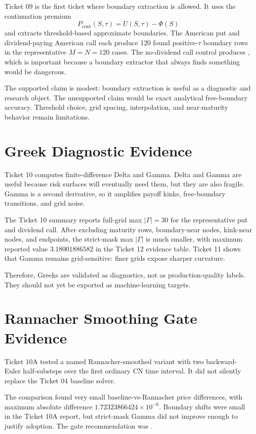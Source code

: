 \documentclass[11pt,a4paper]{article}
\newcommand{\code}[1]{\path{#1}}
\begin{document}
Ticket 09 is the first ticket where boundary extraction is allowed. It uses the continuation premium
\[
P_{\mathrm{cont}}(S,\tau) = U(S,\tau)-\Phi(S)
\]
and extracts threshold-based approximate boundaries. The American put and dividend-paying American call each produce 120 found positive-\(\tau\) boundary rows in the representative \(M=N=120\) cases. The no-dividend call control produces \code{NO_BOUNDARY_FOUND}, which is important because a boundary extractor that always finds something would be dangerous.

The supported claim is modest: boundary extraction is useful as a diagnostic and research object. The unsupported claim would be exact analytical free-boundary accuracy. Threshold choice, grid spacing, interpolation, and near-maturity behavior remain limitations.

\section{Greek Diagnostic Evidence}

Ticket 10 computes finite-difference Delta and Gamma. Delta and Gamma are useful because risk surfaces will eventually need them, but they are also fragile. Gamma is a second derivative, so it amplifies payoff kinks, free-boundary transitions, and grid noise.

The Ticket 10 summary reports full-grid max \(|\Gamma|=30\) for the representative put and dividend call. After excluding maturity rows, boundary-near nodes, kink-near nodes, and endpoints, the strict-mask max \(|\Gamma|\) is much smaller, with maximum reported value \(3.18001886582\) in the Ticket 12 evidence table. Ticket 11 shows that Gamma remains grid-sensitive: finer grids expose sharper curvature.

Therefore, Greeks are validated as diagnostics, not as production-quality labels. They should not yet be exported as machine-learning targets.

\section{Rannacher Smoothing Gate Evidence}

Ticket 10A tested a named Rannacher-smoothed variant with two backward-Euler half-substeps over the first ordinary CN time interval. It did not silently replace the Ticket 04 baseline solver.

The comparison found very small baseline-vs-Rannacher price differences, with maximum absolute difference \(1.72323866424\times10^{-6}\). Boundary shifts were small in the Ticket 10A report, but strict-mask Gamma did not improve enough to justify adoption. The gate recommendation was \code{KEEP_BASELINE_FOR_NOW}.
\end{document}
